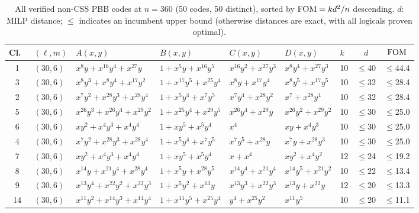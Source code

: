 \begin{table}[t]
\centering
\caption{All verified non-CSS PBB codes at $n = 360$ (50 codes, 50 distinct), sorted by $\mathrm{FOM} = kd^2/n$ descending.
$d$: MILP distance; $\leq$ indicates an incumbent upper bound (otherwise distances are exact, with all logicals proven optimal).}
\label{tab:pbb_cat360}
\tiny
\renewcommand{\arraystretch}{0.82}
\setlength{\tabcolsep}{1.5pt}
\begin{tabular*}{\textwidth}{@{\extracolsep{\fill}}cllllllcc}
\toprule
Cl.\ & $(\ell,m)$ & $A(x,y)$ & $B(x,y)$ & $C(x,y)$ & $D(x,y)$ & $k$ & $d$ & $\mathrm{FOM}$ \\
\midrule
1 & $(30,6)$ & $x^{8}y{+}x^{16}y^{4}{+}x^{27}y$ & $1{+}x^{5}y{+}x^{16}y^{5}$ & $x^{16}y^{2}{+}x^{27}y^{3}$ & $x^{8}y^{4}{+}x^{27}y^{3}$ & 10 & $\leq$40 & $\leq$44.4 \\
3 & $(30,6)$ & $x^{8}y^{3}{+}x^{8}y^{4}{+}x^{17}y^{2}$ & $1{+}x^{17}y^{5}{+}x^{25}y^{4}$ & $x^{8}y{+}x^{17}y^{4}$ & $x^{8}y^{5}{+}x^{17}y^{5}$ & 10 & $\leq$32 & $\leq$28.4 \\
2 & $(30,6)$ & $x^{7}y^{2}{+}x^{28}y^{3}{+}x^{28}y^{4}$ & $1{+}x^{5}y^{4}{+}x^{7}y^{5}$ & $x^{7}y^{4}{+}x^{28}y^{2}$ & $x^{7}{+}x^{28}y^{4}$ & 10 & $\leq$32 & $\leq$28.4 \\
5 & $(30,6)$ & $x^{26}y^{3}{+}x^{26}y^{4}{+}x^{29}y^{2}$ & $1{+}x^{25}y^{4}{+}x^{29}y^{5}$ & $x^{26}y^{4}{+}x^{29}y$ & $x^{26}y^{2}{+}x^{29}y^{2}$ & 10 & $\leq$30 & $\leq$25.0 \\
6 & $(30,6)$ & $xy^{2}{+}x^{4}y^{3}{+}x^{4}y^{4}$ & $1{+}xy^{5}{+}x^{5}y^{4}$ & $x^{4}$ & $xy{+}x^{4}y^{3}$ & 10 & $\leq$30 & $\leq$25.0 \\
4 & $(30,6)$ & $x^{7}y^{2}{+}x^{28}y^{3}{+}x^{28}y^{4}$ & $1{+}x^{5}y^{4}{+}x^{7}y^{5}$ & $x^{7}y^{5}{+}x^{28}y$ & $x^{7}y{+}x^{28}y^{3}$ & 10 & $\leq$30 & $\leq$25.0 \\
7 & $(30,6)$ & $xy^{2}{+}x^{4}y^{3}{+}x^{4}y^{4}$ & $1{+}xy^{5}{+}x^{5}y^{4}$ & $x{+}x^{4}$ & $xy^{2}{+}x^{4}y^{2}$ & 12 & $\leq$24 & $\leq$19.2 \\
8 & $(30,6)$ & $x^{14}y{+}x^{21}y^{4}{+}x^{28}y^{4}$ & $1{+}x^{5}y{+}x^{28}y^{5}$ & $x^{14}y^{4}{+}x^{21}y^{4}$ & $x^{14}y^{5}{+}x^{21}y^{2}$ & 10 & $\leq$22 & $\leq$13.4 \\
9 & $(30,6)$ & $x^{13}y^{4}{+}x^{22}y^{2}{+}x^{22}y^{3}$ & $1{+}x^{5}y^{2}{+}x^{13}y$ & $x^{13}y^{3}{+}x^{22}y^{3}$ & $x^{13}y{+}x^{22}y$ & 12 & $\leq$20 & $\leq$13.3 \\
14 & $(30,6)$ & $x^{11}y^{2}{+}x^{14}y^{3}{+}x^{14}y^{4}$ & $1{+}x^{11}y^{5}{+}x^{25}y^{4}$ & $y^{4}{+}x^{25}y^{2}$ & $x^{11}y^{5}$ & 10 & $\leq$20 & $\leq$11.1 \\

\end{tabular*}
\end{table}
